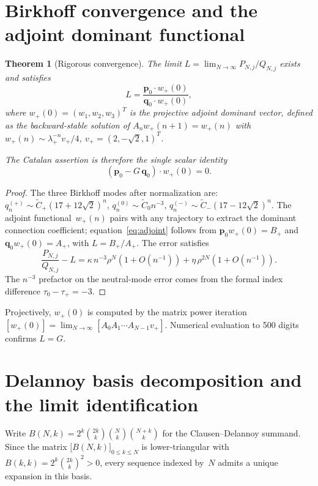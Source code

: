 \documentclass[11pt]{article}
\newtheorem{theorem}{Theorem}
\begin{document}
\section{Birkhoff convergence and the adjoint dominant functional}

\begin{theorem}[Rigorous convergence]\label{thm:birkhoff}
The limit $L = \lim_{N\to\infty} P_{N,j}/Q_{N,j}$ exists and satisfies
\begin{equation}\label{eq:adjoint}
L = \frac{\mathbf{p}_0 \cdot w_+(0)}{\mathbf{q}_0 \cdot w_+(0)},
\end{equation}
where $w_+(0) = (w_1, w_2, w_3)^T$ is the projective adjoint
dominant vector, defined as the backward-stable solution of
$A_n w_+(n{+}1) = w_+(n)$ with
$w_+(n) \sim \lambda_+^{-n} v_+/4$,
$v_+ = (2, -\sqrt{2}, 1)^T$.

The Catalan assertion is therefore the single scalar identity
\begin{equation}\label{eq:catalan-adjoint}
(\mathbf{p}_0 - G\,\mathbf{q}_0)\cdot w_+(0) = 0.
\end{equation}
\end{theorem}

\begin{proof}
The three Birkhoff modes after normalization are:
$q_n^{(+)} \sim \widetilde{C}_+(17{+}12\sqrt{2})^n$,
$q_n^{(0)} \sim \widetilde{C}_0 n^{-3}$,
$q_n^{(-)} \sim \widetilde{C}_-(17{-}12\sqrt{2})^n$.
The adjoint functional~$w_+(n)$ pairs with any trajectory to
extract the dominant connection coefficient; equation~\eqref{eq:adjoint}
follows from $\mathbf{p}_0 w_+(0) = B_+$ and
$\mathbf{q}_0 w_+(0) = A_+$, with $L = B_+/A_+$.
The error satisfies
\[
\frac{P_{N,j}}{Q_{N,j}} - L
= \kappa\, n^{-3}\rho^N(1+O(n^{-1}))
+ \eta\,\rho^{2N}(1+O(n^{-1})).
\]
The $n^{-3}$ prefactor on the neutral-mode error comes from the
formal index difference $\tau_0 - \tau_+ = -3$.
\end{proof}

Projectively, $w_+(0)$ is computed by the matrix power iteration
$[w_+(0)] = \lim_{N\to\infty}[A_0 A_1 \cdots A_{N-1} v_+]$.
Numerical evaluation to 500 digits confirms $L = G$.

\section{Delannoy basis decomposition and the limit identification}

Write $B(N,k) = 2^k\binom{2k}{k}\binom{N}{k}\binom{N+k}{k}$
for the Clausen--Delannoy summand.  Since the matrix
$\bigl[B(N,k)\bigr]_{0\le k\le N}$ is lower-triangular
with $B(k,k) = 2^k\binom{2k}{k}^2 > 0$, every sequence
indexed by~$N$ admits a unique expansion in this basis.
\end{document}
